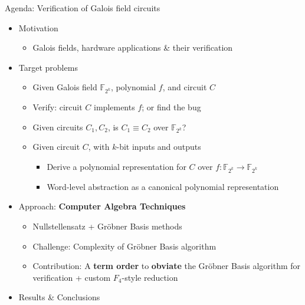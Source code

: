 \documentclass[xcolor=dvipsnames]{beamer}
\newcommand{\Fkk}{{\mathbb{F}}_{2^k}}
\begin{document}
\begin{frame}{\large{Agenda: Verification of Galois field circuits}}

\begin{itemize}
\item Motivation
	\begin{itemize}
	\item Galois fields, hardware applications \& their verification
	\end{itemize}
\item Target problems 
	\begin{itemize}
	\item Given Galois field $\Fkk$, polynomial $f$, and circuit $C$
        \item Verify: circuit $C$ implements $f$; or find the bug
        \item Given circuits $C_1, C_2$, is $C_1 \equiv C_2$ over
          $\Fkk$?
        \item Given circuit $C$, with $k$-bit inputs and outputs
          \begin{itemize}
            \item Derive a polynomial representation for $C$ over $f:
              \Fkk \rightarrow \Fkk$ 
              \item \alert{Word-level abstraction} as a canonical
                polynomial representation
          \end{itemize}
	\end{itemize}
\item Approach: {\bf Computer Algebra Techniques}
	\begin{itemize}
	\item  Nullstellensatz + Gr\"obner Basis methods
        \item  Challenge: Complexity of Gr\"obner Basis algorithm
        \item  Contribution: A {\bf term order} to {\bf obviate} the
          Gr\"obner Basis algorithm for verification + custom
          $F_4$-style reduction
	\end{itemize}
\item Results \& Conclusions
\end{itemize}
\end{frame}
\end{document}
